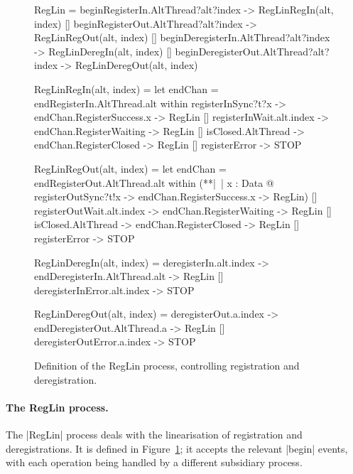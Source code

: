 
\begin{figure}
\begin{cspm}
RegLin = 
  beginRegisterIn.AltThread?alt?index -> RegLinRegIn(alt, index)
  [] beginRegisterOut.AltThread?alt?index -> RegLinRegOut(alt, index)
  [] beginDeregisterIn.AltThread?alt?index -> RegLinDeregIn(alt, index)
  [] beginDeregisterOut.AltThread?alt?index -> RegLinDeregOut(alt, index)
  
RegLinRegIn(alt, index) = 
  let endChan = endRegisterIn.AltThread.alt within
  registerInSync?t?x -> endChan.RegisterSuccess.x -> RegLin
  [] registerInWait.alt.index -> endChan.RegisterWaiting -> RegLin
  [] isClosed.AltThread -> endChan.RegisterClosed -> RegLin
  [] registerError -> STOP

RegLinRegOut(alt, index) = 
  let endChan = endRegisterOut.AltThread.alt within
  (**|~| x : Data @ registerOutSync?t!x -> endChan.RegisterSuccess.x -> RegLin)
  [] registerOutWait.alt.index -> endChan.RegisterWaiting -> RegLin
  [] isClosed.AltThread -> endChan.RegisterClosed -> RegLin
  [] registerError -> STOP
  
RegLinDeregIn(alt, index) = 
  deregisterIn.alt.index -> endDeregisterIn.AltThread.alt -> RegLin
  [] deregisterInError.alt.index -> STOP
    
RegLinDeregOut(alt, index) = 
  deregisterOut.a.index -> endDeregisterOut.AltThread.a -> RegLin
  [] deregisterOutError.a.index -> STOP
\end{cspm}
\caption{Definition of the {\cspmstyle RegLin} process, controlling
  registration and deregistration.  \label{fig:RegLin}}
\end{figure}


\paragraph{The {\cspmstyle RegLin} process.}

The |RegLin| process deals with the linearisation of registration and
deregistrations.  It is defined in Figure~\ref{fig:RegLin}; it accepts the
relevant |begin| events, with each operation being handled by a different
subsidiary process.

